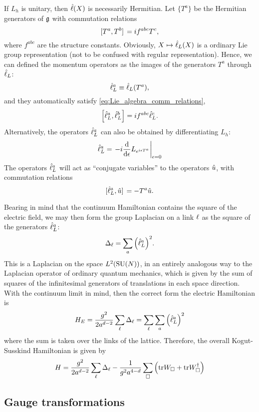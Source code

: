 If $L_h$ is unitary, then $\hat{\ell}(X)$ is necessarily Hermitian.
Let $\{T^a\}$ be the Hermitian generators of $\mathfrak{g}$ with commutation relations
\begin{equation}
    \comm*{T^a}{T^b} = i f^{abc} T^c,
    \label{eq:Lie_algebra_comm_relations}
\end{equation}
where $f^{abc}$ are the structure constants.
Obviously, $X \mapsto \hat{\ell}_L(X)$ is a ordinary Lie group representation (not to be confused with regular representation).
Hence, we can defined the momentum operators as the images of the generators $T^a$ through $\hat{\ell}_L$:
\begin{equation}
    \hat{\ell}^a_L \equiv \hat{\ell}_L(T^a),
\end{equation}
and they automatically satisfy \eqref{eq:Lie_algebra_comm_relations},
\begin{equation}
    \comm{\generator^a_L}{\generator^b_L} = i f^{abc} \generator^c_L.
\end{equation}
Alternatively, the operators $\hat{\ell}^a_L$ can also be obtained by differentiating $L_h$:
\begin{equation}
    \generator^a_L = \eval{-i \dv{\epsilon} L_{e^{i \epsilon T^a}}}_{\epsilon=0}
\end{equation}
The operators $\hat{\ell}^a_L$ will act as ``conjugate variables'' to the operators $\hat{u}$, with commutation relations
\begin{equation}
    \comm*{\generator_L^a}{\transport} = -T^a \transport.
\end{equation}

Bearing in mind that the continuum Hamiltonian contains the square of the electric field, we may then form the group Laplacian on a link $\ell$ as the square of the generators $\hat{\ell}^a_L$:
\begin{equation}
    \Delta_{\ell} = \sum_{a} \qty( \hat{\ell}^a_L )^2.
\end{equation}
This is a Laplacian on the space $L^2(\text{SU}(N))$, in an entirely analogous way to the Laplacian operator of ordinary quantum mechanics, which is given by the sum of squares of the infinitesimal generators of translations in each space direction.
With the continuum limit in mind, then the correct form the electric Hamiltonian is
\begin{equation}
    H_E =
    \frac{g^2}{2 a^{d-2}} \sum_{\ell} \Delta_{\ell} =
    \sum_{\ell} \sum_{a} \qty( \hat{\ell}_L^a )^2
\end{equation}
where the sum is taken over the links of the lattice.
Therefore, the overall Kogut-Susskind Hamiltonian is given by
\begin{equation}
    H =
    \frac{g^2}{2 a^{d-2}} \sum_{\ell} \Delta_{\ell}
    - \frac{1}{g^2 a^{4-d}} \sum_{\square} \qty(
        \text{tr}W_{\square} + \text{tr} W_{\square}^{\dagger}
    )
\end{equation}


\subsection{Gauge transformations}
\label{sub:gauge_transformations}


